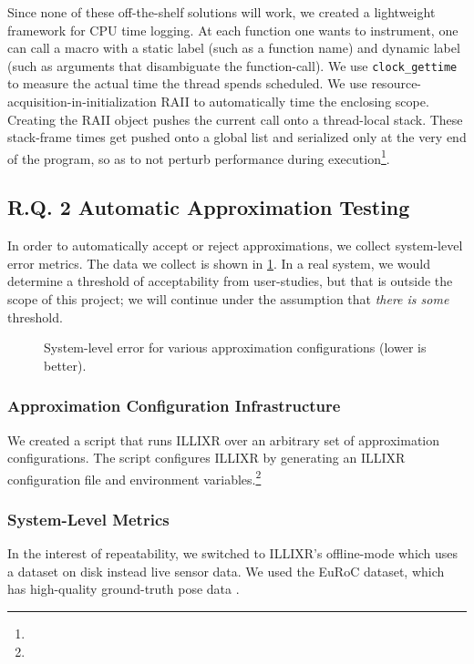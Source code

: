 Since none of these off-the-shelf solutions will work, we created a lightweight framework for CPU time logging.
At each function one wants to instrument, one can call a macro with a static label (such as a function name) and dynamic label (such as arguments that disambiguate the function-call).
We use \verb+clock_gettime+ to measure the actual time the thread spends scheduled.
We use resource-acquisition-in-initialization RAII to automatically time the enclosing scope.
Creating the RAII object pushes the current call onto a thread-local stack.
These stack-frame times get pushed onto a global list and serialized only at the very end of the program, so as to not perturb performance during execution\footnote{}.

\subsection{R.Q. 2 Automatic Approximation Testing}

In order to automatically accept or reject approximations, we collect system-level error metrics.
The data we collect is shown in \cref{errors}.
In a real system, we would determine a threshold of acceptability from user-studies, but that is outside the scope of this project;
  we will continue under the assumption that \textit{there is some} threshold.

\begin{figure}
  \label{errors}
  \caption{System-level error for various approximation configurations (lower is better).}
\end{figure}

\subsubsection{Approximation Configuration Infrastructure}

We created a script that runs ILLIXR over an arbitrary set of approximation configurations.
The script configures ILLIXR by generating an ILLIXR configuration file and environment variables.\footnote{}

\subsubsection{System-Level Metrics}

In the interest of repeatability, we switched to ILLIXR's offline-mode which uses a dataset on disk instead live sensor data.
We used the EuRoC dataset, which has high-quality ground-truth pose data \cite{Burri25012016}.

